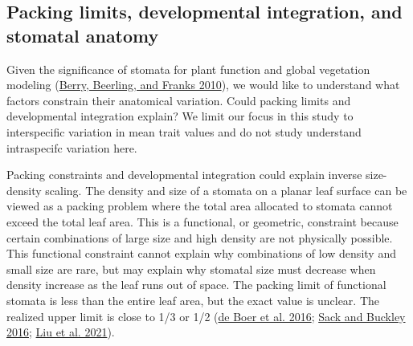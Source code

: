 \documentclass[
  12pt,
]{article}
\begin{document}
\hypertarget{packing-limits-developmental-integration-and-stomatal-anatomy}{%
\subsection{Packing limits, developmental integration, and stomatal anatomy}\label{packing-limits-developmental-integration-and-stomatal-anatomy}}

Given the significance of stomata for plant function and global vegetation modeling (\protect\hyperlink{ref-berry_stomata:_2010}{Berry, Beerling, and Franks 2010}), we would like to understand what factors constrain their anatomical variation. Could packing limits and developmental integration explain? We limit our focus in this study to interspecific variation in mean trait values and do not study understand intraspecifc variation here.

Packing constraints and developmental integration could explain inverse size-density scaling. The density and size of a stomata on a planar leaf surface can be viewed as a packing problem where the total area allocated to stomata cannot exceed the total leaf area. This is a functional, or geometric, constraint because certain combinations of large size and high density are not physically possible. This functional constraint cannot explain why combinations of low density and small size are rare, but may explain why stomatal size must decrease when density increase as the leaf runs out of space. The packing limit of functional stomata is less than the entire leaf area, but the exact value is unclear. The realized upper limit is close to 1/3 or 1/2 (\protect\hyperlink{ref-de_boer_optimal_2016}{de Boer et al. 2016}; \protect\hyperlink{ref-sack_developmental_2016}{Sack and Buckley 2016}; \protect\hyperlink{ref-liu_scaling_2021}{Liu et al. 2021}).
\end{document}

